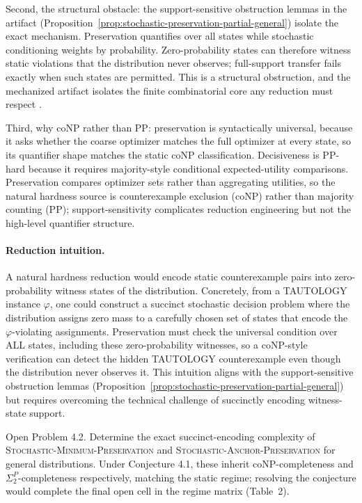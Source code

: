 Second, the structural obstacle: the support-sensitive obstruction lemmas in the artifact
(Proposition~\ref{prop:stochastic-preservation-partial-general}) isolate the exact mechanism.
Preservation quantifies over all states while stochastic conditioning weights by probability.
Zero-probability states can therefore witness static violations that the distribution never
observes; full-support transfer fails exactly when such states are permitted. This is a
structural obstruction, and the mechanized artifact isolates the finite combinatorial core
any reduction must respect .

Third, why coNP rather than PP: preservation is syntactically universal, because it asks whether the
coarse optimizer matches the full optimizer at every state, so its quantifier shape matches
the static coNP classification. Decisiveness is PP-hard because it requires majority-style
conditional expected-utility comparisons. Preservation compares optimizer sets rather than
aggregating utilities, so the natural hardness source is counterexample exclusion (coNP)
rather than majority counting (PP); support-sensitivity complicates reduction engineering
but not the high-level quantifier structure.

\paragraph{Reduction intuition.}
A natural hardness reduction would encode static counterexample pairs into zero-probability witness states of the distribution. Concretely, from a TAUTOLOGY instance $\varphi$, one could construct a succinct stochastic decision problem where the distribution assigns zero mass to a carefully chosen set of states that encode the $\varphi$-violating assignments. Preservation must check the universal condition over ALL states, including these zero-probability witnesses, so a coNP-style verification can detect the hidden TAUTOLOGY counterexample even though the distribution never observes it. This intuition aligns with the support-sensitive obstruction lemmas (Proposition~\ref{prop:stochastic-preservation-partial-general}) but requires overcoming the technical challenge of succinctly encoding witness-state support.

Open Problem 4.2. Determine the exact succinct-encoding complexity of
\textsc{Stochastic-Minimum-Preservation} and \textsc{Stochastic-Anchor-Preservation}
for general distributions. Under Conjecture 4.1, these inherit coNP-completeness and
$\Sigma_2^P$-completeness respectively, matching the static regime; resolving the conjecture
would complete the final open cell in the regime matrix (Table~2).

